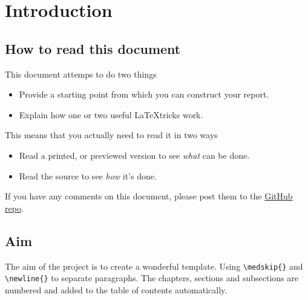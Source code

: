 \section{Introduction}

\subsection{How to read this document}

This document attemps to do two things
\begin{itemize}
    \item Provide a starting point from which you can construct your report.
    \item Explain how one or two useful \LaTeX tricks work.
\end{itemize}
\medskip %
This means that you actually need to read it in two ways
\begin{itemize}
    \item Read a printed, or previewed version to see \textit{what} can be done.
    \item Read the source to see \textit{how} it’s done.
\end{itemize}
If you have any comments on this document, please post them to the \href{https://github.com/poltriquell/LaTeX_report_template}{GitHub repo}.

\subsection{Aim}
The aim of the project is to create a wonderful template.
Using \verb!\medskip{}! and \verb!\newline{}! to separate paragraphs. The chapters, sections and subsections are numbered and added to the table of contents automatically.